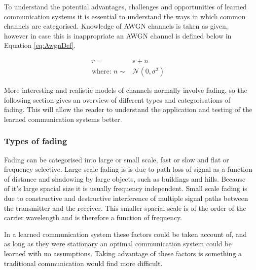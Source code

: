\documentclass[12pt,onecolumn,letterpaper]{article}
\begin{document}
To understand the potential advantages, challenges and opportunities of learned communication systems it is essential to understand the ways in which common channels are categorised. Knowledge of AWGN channels is taken as given, however in case this is inappropriate an AWGN channel is defined below in Equation \ref{eq:AwgnDef}.

\begin{align}
   r =& s + n \\
   \mbox{where: } n \sim& \mathcal{N}(0,\sigma^2)
   \label{eq:AwgnDef}
\end{align}

More interesting and realistic models of channels normally involve fading, so the following section gives an overview of different types and categorisations of fading. This will allow the reader to understand the application and testing of the learned communication systems better.

\subsubsection{Types of fading}
\label{sec:TypesOfFading}

Fading can be categorised into large or small scale, fast or slow and flat or frequency selective. Large scale fading is is due to path loss of signal as a function of distance and shadowing by large objects, such as buildings and hills. Because of it's large spacial size it is usually frequency independent. Small scale fading is due to constructive and destructive interference of multiple signal paths between the transmitter and the receiver. This smaller spacial scale is of the order of the carrier wavelength and is therefore a function of frequency. 

In a learned communication system these factors could be taken account of, and as long as they were stationary an optimal communication system could be learned with no assumptions. Taking advantage of these factors is something a traditional communication would find more difficult.
\end{document}
